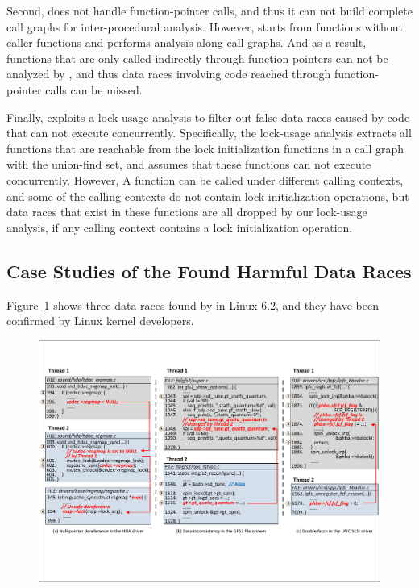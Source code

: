 Second, \sys does not handle function-pointer calls, and thus it can not build 
complete call graphs for inter-procedural analysis. However, \sys starts 
from functions without caller functions and performs analysis along call 
graphs. And as a result, functions that are only called indirectly through 
function pointers can not be analyzed by \sys, and thus data races involving 
code reached through function-pointer calls can be missed.

Finally, \sys exploits a lock-usage analysis to filter out false data races 
caused by code that can not execute concurrently. Specifically, the lock-usage 
analysis extracts all functions that are reachable from the lock initialization 
functions in a call graph with the union-find set, and assumes that these 
functions can not execute concurrently. However, A function can be called under 
different calling contexts, and some of the calling contexts do not contain 
lock initialization operations, but data races that exist in these functions 
are all dropped by our lock-usage analysis, if any calling context contains a 
lock initialization operation.

\subsection{Case Studies of the Found Harmful Data Races}
\label{subsec_case_study}

Figure~\ref{fig_case_bugs} shows three data races found by \sys in Linux 6.2,
and they have been confirmed by Linux kernel developers.

\begin{figure}[htbp]
	\centering
	\includegraphics[width=1\linewidth]{figures/fig_case_bugs.pdf}
	\label{fig_case_bugs}
\end{figure}


